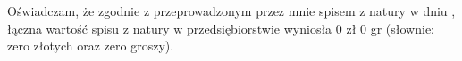 \vspace{2cm}

Oświadczam, że zgodnie z przeprowadzonym przez mnie spisem z natury w dniu \shortdate, łączna wartość spisu z natury w przedsiębiorstwie \companyname{} wyniosła 0 zł 0 gr (słownie: zero złotych oraz zero groszy).

\vspace{1.5cm}


\begin{minipage}{0.45\textwidth}
\begin{flushleft}
    \footnotesize{
        \makebox[6cm]{\dotfill}
        \par
    }
\end{flushleft}
\end{minipage}
\hfill
\begin{minipage}{0.45\textwidth}
\begin{flushright}
    \footnotesize{
        \makebox[6cm]{\dotfill}
        \par
    }
\end{flushright}
\end{minipage}

\clearpage
